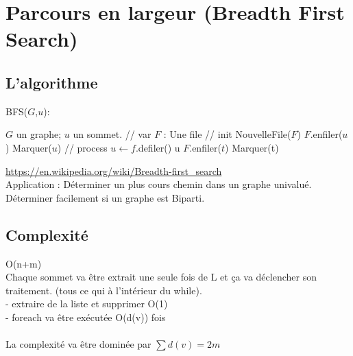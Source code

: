 \documentclass{article}
\begin{document}
\newpage
\section{Parcours en largeur (Breadth First Search)}
\subsection{L'algorithme}
\begin{algorithm}
\caption{BFS($G$,$u$):}
\begin{algorithmic}
\REQUIRE $G$ un graphe; $u$ un sommet. 
\STATE // var
\STATE $F$ : Une file 
\STATE // init 
\STATE NouvelleFile($F$)
\STATE $F$.enfiler($u$)
\STATE Marquer($u$)
\STATE // process
\STATE $u \leftarrow f$.defiler()
\PRINT u
\STATE $F$.enfiler($t$)
\STATE Marquer(t)
\ENDIF
\ENDFOR
\ENDWHILE
\end{algorithmic}
\end{algorithm}
\url{https://en.wikipedia.org/wiki/Breadth-first_search} \\
Application : Déterminer un plus cours chemin dans un graphe univalué. Déterminer facilement si un graphe est Biparti.  
\subsection{Complexité}
O(n+m) \\
Chaque sommet va être extrait une seule fois de L et ça va déclencher son traitement. (tous ce qui à l’intérieur du while). \\
- extraire de la liste et supprimer O(1) \\
- foreach va être exécutée O(d(v)) fois \\
\\
La complexité va être dominée par $\sum d(v)=2m$
\end{document}
